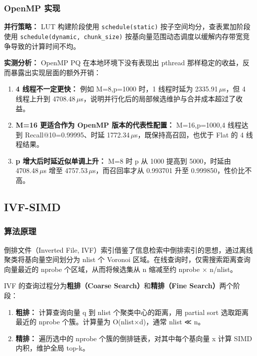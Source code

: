 \documentclass[a4paper]{article}
\begin{document}
\subsubsection{OpenMP 实现}

\textbf{并行策略：} LUT 构建阶段使用 \texttt{schedule(static)} 按子空间均分，查表累加阶段使用 \texttt{schedule(dynamic, chunk\_size)} 按基向量范围动态调度以缓解内存带宽竞争导致的计算时间不均。

\textbf{实测分析：} OpenMP PQ 在本地环境下没有表现出 pthread 那样稳定的收益，反而暴露出实现层面的额外开销：

\begin{enumerate}
\item \textbf{4 线程不一定更快：} 例如 M=8,p=1000 时，1 线程时延为 2335.91\,$\mu$s，但 4 线程上升到 4708.48\,$\mu$s，说明并行化后的局部候选维护与合并成本超过了收益。
\item \textbf{M=16 更适合作为 OpenMP 版本的代表性配置：} M=16,p=1000,4 线程达到 Recall@10=0.99995、时延 1772.34\,$\mu$s，既保持高召回，也优于 Flat 的 4 线程结果。
\item \textbf{p 增大后时延近似单调上升：} M=8 时 p 从 1000 提高到 5000，时延由 4708.48\,$\mu$s 增至 4757.53\,$\mu$s，而召回率才从 0.993701 升至 0.999850，性价比不高。
\end{enumerate}

\subsection{IVF-SIMD}

\subsubsection{算法原理}

倒排文件（Inverted File, IVF）索引借鉴了信息检索中倒排索引的思想，通过离线聚类将基向量空间划分为 nlist 个 Voronoi 区域。在线查询时，仅需搜索距离查询向量最近的 nprobe 个区域，从而将候选集从 n 缩减至约 nprobe × n/nlist。

IVF 的查询过程分为\textbf{粗排（Coarse Search）}和\textbf{精排（Fine Search）}两个阶段：

\begin{enumerate}
\item \textbf{粗排：} 计算查询向量 q 到 nlist 个聚类中心的距离，用 partial sort 选取距离最近的 nprobe 个簇。计算量为 O(nlist×d)，通常 nlist ≪ n。
\item \textbf{精排：} 遍历选中的 nprobe 个簇的倒排链表，对其中每个基向量 x 计算 SIMD 内积，维护全局 top-k。
\end{enumerate}
\end{document}
